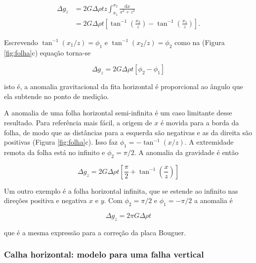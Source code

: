 \documentclass[]{book}
\theoremstyle{definition}
\theoremstyle{definition}
\theoremstyle{definition}
\theoremstyle{remark}
\begin{document}
\begin{equation}
\begin{aligned} \Delta g_{z} &=2 G \Delta \rho t z \int_{x_{1}}^{x_{2}} \frac{\mathrm{d} x}{x^{2}+z^{2}} \\ &=2 G \Delta \rho t\left[\tan ^{-1}\left(\frac{x_{2}}{z}\right)-\tan ^{-1}\left(\frac{x_{1}}{z}\right)\right]. \end{aligned}  \label{eq:0267}
\end{equation}

Escrevendo \(\tan ^{-1}\left(x_{1} / z\right)=\phi_{1}\) e \(\tan ^{-1}\left(x_{2} / z\right)=\phi_{2}\) como na (Figura \ref{fig:folha}c) equação torna-se

\begin{equation}
\Delta g_{z}=2 G \Delta \rho t\left[\phi_{2}-\phi_{1}\right] \label{eq:0268}
\end{equation}

isto é, a anomalia gravitacional da fita horizontal é proporcional ao ângulo que ela subtende no ponto de medição.

A anomalia de uma folha horizontal semi-infinita é um caso limitante desse resultado. Para referência mais fácil, a origem de \(x\) é movida para a borda da folha, de modo que as distâncias para a esquerda são negativas e as da direita são positivas (Figura \ref{fig:folha}c). Isso faz \(\phi_{1}=-\tan ^{-1}(x / z)\). A extremidade remota da folha está no infinito e \(\phi_2 =\pi / 2\). A anomalia da gravidade é então

\begin{equation}
\Delta g_{z}=2 G \Delta \rho t\left[\frac{\pi}{2}+\tan ^{-1}\left(\frac{x}{z}\right)\right]  \label{eq:0269}
\end{equation}

Um outro exemplo é a folha horizontal infinita, que se estende ao infinito nas direções positiva e negativa \(x\) e \(y\). Com \(\phi_2=\pi/2\) e \(\phi_1=-\pi/2\) a anomalia é

\begin{equation}
\Delta g_{z}=2 \pi G \Delta \rho t \label{eq:0270}
\end{equation}

que é a mesma expressão para a correção da placa Bouguer.

\hypertarget{calha-horizontal-modelo-para-uma-falha-vertical}{%
\subsubsection{Calha horizontal: modelo para uma falha vertical}\label{calha-horizontal-modelo-para-uma-falha-vertical}}
\end{document}
